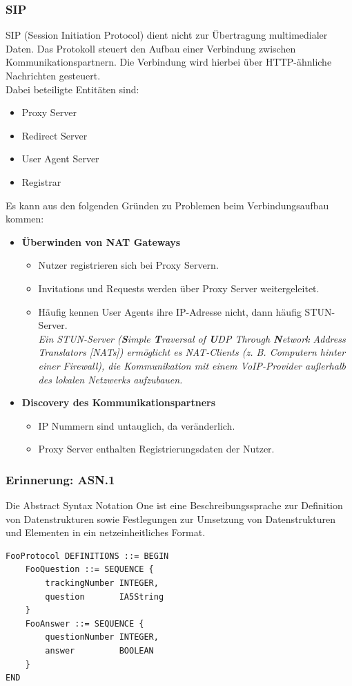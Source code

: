 \documentclass{article} %
\begin{document}
\subsubsection{SIP}	
	SIP (Session Initiation Protocol)\cite{rfc2543} dient nicht zur Übertragung multimedialer Daten. Das Protokoll steuert den Aufbau einer Verbindung zwischen Kommunikationspartnern. Die Verbindung wird hierbei über HTTP-ähnliche Nachrichten gesteuert.\\
	Dabei beteiligte Entitäten sind:
	\begin{itemize}
	\item Proxy Server 
	\item Redirect Server 
	\item User Agent Server 
	\item Registrar 
	\end{itemize}
	Es kann aus den folgenden Gründen zu Problemen beim Verbindungsaufbau kommen:
	\begin{itemize}
	\item \textbf{Überwinden von NAT Gateways} 
		\begin{itemize}
		\item Nutzer registrieren sich bei Proxy Servern. 
		\item Invitations und Requests werden über Proxy Server weitergeleitet. 
		\item Häufig kennen User Agents ihre IP-Adresse nicht, dann häufig STUN-Server. \\
		\textit{Ein STUN-Server (\textbf{S}imple \textbf{T}raversal of \textbf{U}DP Through \textbf{N}etwork Address Translators [NATs]) ermöglicht es NAT-Clients (z. B. Computern hinter einer Firewall), die Kommunikation mit einem VoIP-Provider außerhalb des lokalen Netzwerks aufzubauen.}
		\end{itemize}
	\item \textbf{Discovery des Kommunikationspartners}
		\begin{itemize}
		\item IP Nummern sind untauglich, da veränderlich. 
		\item Proxy Server enthalten Registrierungsdaten der Nutzer. 
		\end{itemize}
	\end{itemize}
	
\subsubsection{Erinnerung: ASN.1}	
	Die Abstract Syntax Notation One ist eine Beschreibungssprache zur Definition von Datenstrukturen sowie Festlegungen zur Umsetzung von Datenstrukturen und Elementen in ein netzeinheitliches Format.
	\begin{verbatim}
FooProtocol DEFINITIONS ::= BEGIN 
    FooQuestion ::= SEQUENCE { 
        trackingNumber INTEGER, 
        question       IA5String 
    } 
    FooAnswer ::= SEQUENCE { 
        questionNumber INTEGER, 
        answer         BOOLEAN 
    } 
END 
	\end{verbatim}
	
\end{document}
